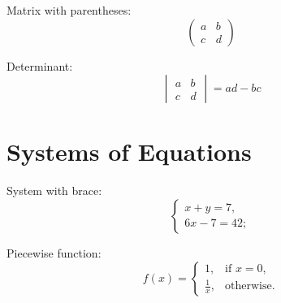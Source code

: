 \documentclass{article}
\begin{document}
Matrix with parentheses:
\begin{equation*}
\begin{pmatrix}
a & b \\
c & d
\end{pmatrix}
\end{equation*}

Determinant:
\begin{equation*}
\begin{vmatrix}
a & b \\
c & d
\end{vmatrix} = ad - bc
\end{equation*}

\section{Systems of Equations}

System with brace:
\begin{equation*}
\begin{cases}
x + y = 7, \\
6x - 7 = 42;
\end{cases}
\end{equation*}

Piecewise function:
\begin{equation*}
f(x) = 
\begin{cases}
1, & \text{if } x = 0, \\
\frac{1}{x}, & \text{otherwise}.
\end{cases}
\end{equation*}
\end{document}
